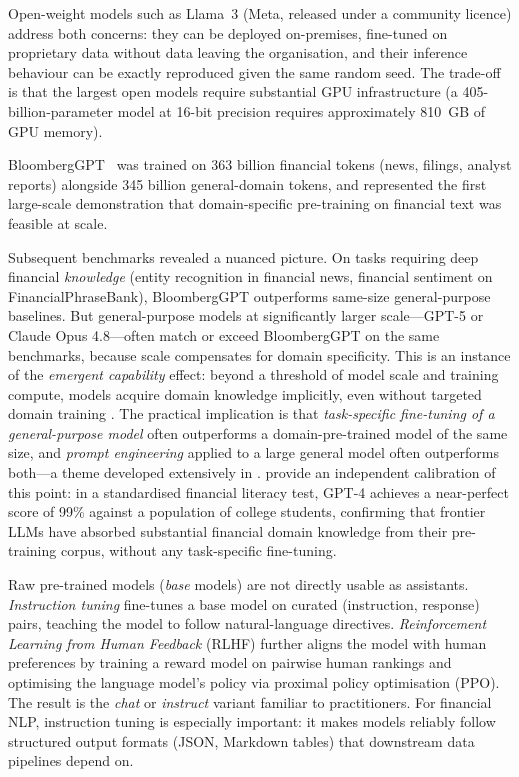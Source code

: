 \begin{context}
Open-weight models such as Llama~3 \citep{touvron2023llama} (Meta, released under a community licence) address
both concerns: they can be deployed on-premises, fine-tuned on proprietary data
without data leaving the organisation, and their inference behaviour can be exactly
reproduced given the same random seed.  The trade-off is that the largest open models
require substantial GPU infrastructure (a 405-billion-parameter model at 16-bit
precision requires approximately 810~GB of GPU memory).

BloombergGPT~\cite{wu2023bloomberggpt} %
was trained on 363 billion financial tokens (news, filings, analyst reports) alongside
345 billion general-domain tokens, and represented the first large-scale demonstration
that domain-specific pre-training on financial text was feasible at scale.

Subsequent benchmarks revealed a nuanced picture.  On tasks requiring deep financial
\emph{knowledge} (entity recognition in financial news, financial sentiment on
FinancialPhraseBank), BloombergGPT outperforms same-size general-purpose baselines.
But general-purpose models at significantly larger scale---GPT-5 or Claude Opus 4.8---often
match or exceed BloombergGPT on the same benchmarks, because scale compensates for
domain specificity.  This is an instance of the \emph{emergent capability} effect:
beyond a threshold of model scale and training compute, models acquire domain knowledge
implicitly, even without targeted domain training \citep{wei2022emergent}.
The practical implication is that \emph{task-specific fine-tuning of a general-purpose
model} often outperforms a domain-pre-trained model of the same size, and
\emph{prompt engineering} applied to a large general model often outperforms
both---a theme developed extensively in .
\citet{niszczota2023gpt} provide an independent calibration of this point: in a
standardised financial literacy test, GPT-4 achieves a near-perfect score of 99\%
against a population of college students, confirming that frontier LLMs have absorbed
substantial financial domain knowledge from their pre-training corpus, without any
task-specific fine-tuning.

Raw pre-trained models (\emph{base} models) are not directly usable as assistants.
\emph{Instruction tuning} fine-tunes a base model on curated (instruction, response)
pairs, teaching the model to follow natural-language directives.
\emph{Reinforcement Learning from Human Feedback} (RLHF) \cite{ouyang2022training}
further aligns the model with human preferences by training a reward model on pairwise
human rankings and optimising the language model's policy via proximal policy
optimisation (PPO).  The result is the \emph{chat} or \emph{instruct} variant
familiar to practitioners.  For financial NLP, instruction tuning is especially
important: it makes models reliably follow structured output formats (JSON, Markdown
tables) that downstream data pipelines depend on.


\end{context}
